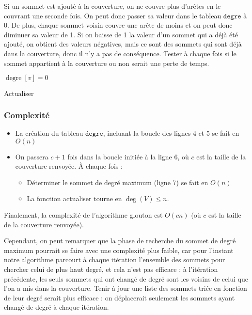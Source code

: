 \documentclass[a4paper,10pt]{article}
\newcommand*{\itemb}{\item[$\bullet$]}
\newcommand*{\itemt}{\item[$\blacktriangleright$]}
\DeclareMathOperator{\degree}{degre}
\DeclareMathOperator{\voisin}{voisin}
\begin{document}
\vspace{0.35cm}
Si un sommet est ajouté à la couverture, on ne couvre plus d'arêtes en le couvrant une seconde fois. On peut donc passer sa valeur dans le tableau $\mathtt{degre}$ à 0. De plus, chaque sommet voisin couvre une arête de moins et on peut donc diminuer sa valeur de 1. Si on baisse de 1 la valeur d'un sommet qui a déjà été ajouté, on obtient des valeurs négatives, mais ce sont des sommets qui sont déjà dans la couverture, donc il n'y a pas de conséquence. Tester à chaque fois si le sommet appartient à la couverture ou non serait une perte de temps.

\vspace{0.35cm}
\begin{algorithm}[H]

\BlankLine
$\degree[v]=0$

\Pour{$i\in \voisin[v]$}{

décrémenter $\voisin[i]$ de 1
}
\caption{Actualiser}
 
\end{algorithm}

\subsubsection{Complexité}

\begin{itemize}
 \itemb La création du tableau $\mathtt{degre}$, incluant la boucle des lignes 4 et 5 se fait en $O(n)$
 \itemb On passera $c+1$ fois dans la boucle initiée à la ligne 6, où $c$ est la taille de la couverture renvoyée. À chaque fois :
\begin{itemize}
\itemt Déterminer le sommet de degré maximum (ligne 7) se fait en $O(n)$
\itemt La fonction actualiser tourne en $\deg(V)\leqslant n$.
\end{itemize}
\end{itemize}

Finalement, la complexité de l'algorithme glouton est $O(cn)$ (où $c$ est la taille de la couverture renvoyée).

Cependant, on peut remarquer que la phase de recherche du sommet de degré maximum pourrait se faire avec une complexité plus faible, car pour l'instant notre algorithme parcourt à chaque itération l'ensemble des sommets pour chercher celui de plus haut degré, et cela n'est pas efficace : à l'itération précédente, les seuls sommets qui ont changé de degré sont les voisins de celui que l'on a mis dans la couverture. Tenir à jour une liste des sommets triée en fonction de leur degré serait plus efficace : on déplacerait seulement les sommets ayant changé de degré à chaque itération.
\end{document}
